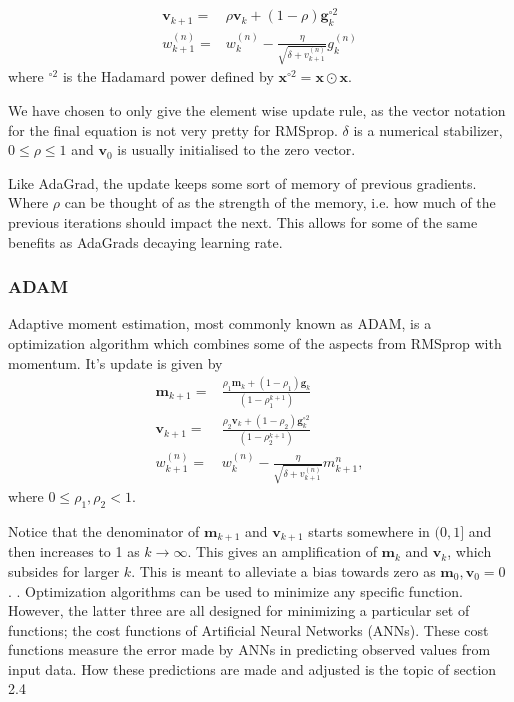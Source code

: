 \documentclass{article}
\theoremstyle{definition}
\begin{document}
\begin{align*}
    \boldsymbol{v}_{k+1} =& \rho \boldsymbol{v}_{k} + (1-\rho) \boldsymbol{g}_k^{\circ 2}\\
    w_{k+1}^{(n)} =& w_k^{(n)} - \frac{\eta}{  \sqrt{\delta + v_{k+1}^{(n)}}} g_k^{(n)}
\end{align*}
where $^{\circ 2}$ is the Hadamard power defined by $\boldsymbol{x}^{\circ 2} = \boldsymbol{x} \odot \boldsymbol{x}$.

We have chosen to only give the element wise update rule, as the vector notation for the final equation is not very pretty for RMSprop. $\delta$ is a numerical stabilizer, $0 \leq \rho \leq 1$ and $\boldsymbol{v}_0$ is usually initialised to the zero vector.

Like AdaGrad, the update keeps some sort of memory of previous gradients. Where $\rho$ can be thought of as the strength of the memory, i.e. how much of the previous iterations should impact the next. This allows for some of the same benefits as AdaGrads decaying learning rate.

\subsubsection{ADAM}
Adaptive moment estimation, most commonly known as ADAM, is a optimization algorithm which combines some of the aspects from RMSprop with momentum. It's update is given by
\begin{align*}
    \boldsymbol{m}_{k+1} =& \frac{\rho_1 \boldsymbol{m}_k + (1- \rho_1) \boldsymbol{g}_k}{\left(1 - \rho_1^{k+1}\right)}\\
    \boldsymbol{v}_{k+1} =& \frac{\rho_2 \boldsymbol{v}_k + (1-\rho_2) \boldsymbol{g}_k^{\circ 2}}{\left(1-\rho_2^{k+1}\right)}\\
    w_{k+1}^{(n)} =& w_k^{(n)} - \frac{\eta}{ \sqrt{\delta+v_{k+1}^{(n)}}} m_{k+1}^{n},
\end{align*}
where $0 \leq \rho_1,\rho_2 < 1$.

Notice that the denominator of $\boldsymbol{m}_{k+1}$ and $\boldsymbol{v}_{k+1}$ starts somewhere in $(0,1]$ and then increases to 1 as $k \to \infty$. This gives an amplification of $\boldsymbol{m}_k$ and $\boldsymbol{v}_k$, which subsides for larger $k$. This is meant to alleviate a bias towards zero as $\boldsymbol{m}_0, \boldsymbol{v}_0 = 0$ \parencite[Section 3]{kingma2014adam}.
\label{AdamAmp}.
Optimization algorithms can be used to minimize any specific function. However, the latter three are all designed for minimizing a particular set of functions; the cost functions of Artificial Neural Networks (ANNs). These cost functions measure the error made by ANNs in predicting observed values from input data. How these predictions are made and adjusted is the topic of section 2.4
\end{document}
